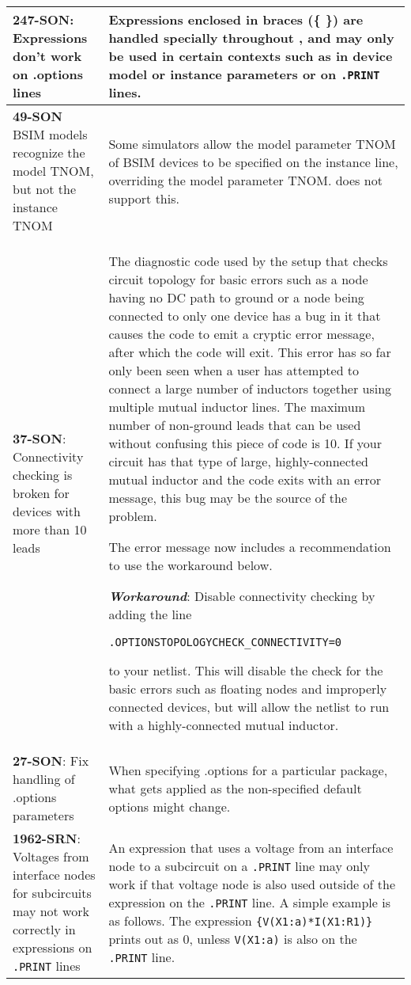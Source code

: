 {\begin{longtable}[h] {>{\raggedright\small}m{2in}|>{\raggedright\let\\\tabularnewline\small}m{3.5in}}
\textbf{247-SON}: Expressions don't work on .options lines & Expressions enclosed
in braces (\{ \}) are handled specially throughout \Xyce{}, and may only be used
in certain contexts such as in device model or instance parameters or on
\texttt{.PRINT} lines.
\\ \hline


\textbf{49-SON} \Xyce{} BSIM models recognize the model TNOM, but not the
instance TNOM & Some simulators allow the model parameter TNOM of BSIM devices to be specified on the instance line, overriding the model parameter TNOM.  \Xyce{} does not support this.
\\ \hline

\textbf{37-SON}: Connectivity checking is broken for devices with more than 10
leads & The diagnostic code used by the \Xyce{} setup that checks circuit
topology for basic errors such as a node having no DC path to ground or a node
being connected to only one device has a bug in it that causes the code to emit
a cryptic error message, after which the code will exit.  This error has so far
only been seen when a user has attempted to connect a large number of inductors
together using multiple mutual inductor lines.  The maximum number of
non-ground leads that can be used without confusing this piece of code is 10.
If your circuit has that type of large, highly-connected mutual inductor and
the code exits with an error message, this bug may be the source of the problem.

The error message now includes a recommendation to use the workaround below.

\textbf{\textit{Workaround}}: Disable connectivity checking by adding the line

\begin{alltt} .OPTIONS TOPOLOGY CHECK_CONNECTIVITY=0 \end{alltt}

to your netlist.  This will disable the check for the basic errors such as
floating nodes and improperly connected devices, but will allow the netlist to
run with a highly-connected mutual inductor.
\\ \hline


\textbf{27-SON}: Fix handling of .options parameters & When specifying .options
  for a particular package, what gets applied as the non-specified default
  options might change.  \\ \hline

\textbf{1962-SRN}: Voltages from interface nodes for subcircuits may not work
correctly in expressions on \texttt{.PRINT} lines & An expression that uses a 
voltage from an interface node to a subcircuit on a \texttt{.PRINT} line 
may only work if that voltage node is also used outside of the expression on 
the \texttt{.PRINT} line.  A simple example is as follows.  The expression 
\texttt{\{V(X1:a)*I(X1:R1)\}} prints out as 0, unless \texttt{V(X1:a)} is also on 
the \texttt{.PRINT} line.
\\ \hline


\end{longtable}}
